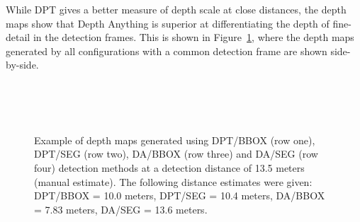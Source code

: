 While DPT gives a better measure of depth scale at close distances, the depth maps show that
Depth Anything is superior at differentiating the depth of fine-detail in the detection frames.
This is shown in Figure~\ref{fig:fine_detail}, where the depth maps generated by all
configurations with a common detection frame are shown side-by-side.


\begin{figure}[H]
    \centering
    \\[1mm]
    \\[1mm]
    \\[1mm]
    \caption{Example of depth maps generated using DPT/BBOX (row one), DPT/SEG
        (row two), DA/BBOX (row three) and DA/SEG (row four) detection methods at a detection
        distance of 13.5 meters (manual estimate). The following distance estimates were given:
        DPT/BBOX = 10.0 meters, DPT/SEG = 10.4 meters, DA/BBOX = 7.83 meters, DA/SEG = 13.6 meters.}
    \label{fig:fine_detail}
\end{figure}

